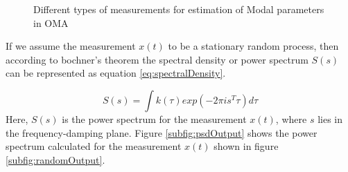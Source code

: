 \begin{figure}[!ht]
  \centering
  \quad
  \quad
  
  \caption{Different types of measurements for estimation of Modal parameters in OMA}
\end{figure}

\indent If we assume the measurement \(x(t)\) to be a stationary random process, then according to bochner's theorem \cite{bochner2016lectures} the spectral density or power spectrum \(S(s)\) can be represented as equation \ref{eq:spectralDensity}.

\begin{equation}\label{eq:spectralDensity}
    S(s) = \int k(\tau)exp(-2 \pi i s^{T} \tau )d\tau 
\end{equation}
Here, \(S(s)\) is the power spectrum for the measurement \(x(t)\), where \(s\) lies in the frequency-damping plane. Figure \ref{subfig:psdOutput} shows the power spectrum calculated for the measurement \(x(t)\) shown in figure \ref{subfig:randomOutput}. 

